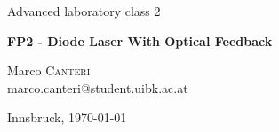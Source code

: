 \documentclass[a4paper,10pt]{article}
\begin{document}
\begin{titlepage}
 \begin{center}
	\Large{Advanced laboratory class 2}
	\end{center}
	\begin{center}
	 \LARGE{\textbf{FP2 - Diode Laser With Optical Feedback}}
	\end{center}
	
	\begin{center}
	
	\large Marco \textsc{Canteri} \\
	marco.canteri@student.uibk.ac.at
	\end{center}
	
	\begin{center}
	\vspace{1cm}
	Innsbruck, \today
	\vspace{2cm}
	\end{center}
	

\end{titlepage}
\end{document}
